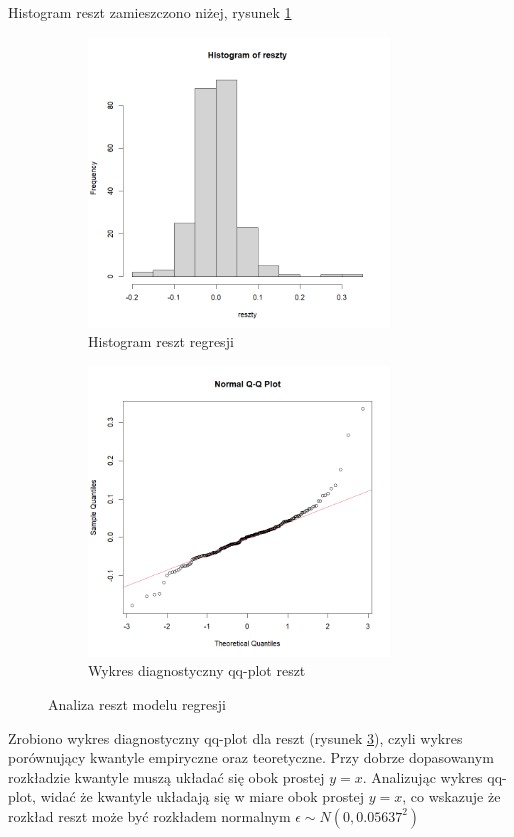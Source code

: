 \documentclass[a4paper,11pt]{article}
\begin{document}
Histogram reszt zamieszczono niżej, rysunek \ref{fig:hist_reszty}
\begin{figure}
  \begin{subfigure}{0.5\textwidth}
    \includegraphics[width=8cm]{images/hist_reszty.png}
    \caption{Histogram reszt regresji}
    \label{fig:hist_reszty}
  \end{subfigure}%
  \begin{subfigure}{0.5\textwidth}
    \includegraphics[width=8cm]{images/qq_reszty.png}
    \caption{Wykres diagnostyczny qq-plot reszt}
    \label{fig:qq_reszty}
  \end{subfigure}
  \caption{Analiza reszt modelu regresji}
\end{figure}

Zrobiono wykres diagnostyczny qq-plot dla reszt (rysunek \ref{fig:qq_reszty}), czyli wykres porównujący kwantyle empiryczne oraz teoretyczne. Przy dobrze dopasowanym rozkładzie kwantyle muszą układać się obok prostej $y=x$. Analizując wykres qq-plot, widać że kwantyle układają się w miare obok prostej $y=x$, co wskazuje że rozkład reszt może być rozkładem normalnym $\epsilon \sim N(0, 0.05637^2)$
\end{document}
